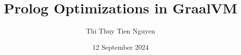\documentclass[instructions]{./Packages/uqthesis}
\title{Prolog Optimizations in GraalVM}
\author{Thi Thuy Tien Nguyen}
\date{12 September 2024}
\begin{document}
\frontmatter
\maketitle
\thispagestyle{empty}

\clearpage

\begin{KeepFromToc}
    \setcounter{page}{0} %
    \tableofcontents
\end{KeepFromToc}
\clearpage
\openany

\mainmatter










\end{document}
